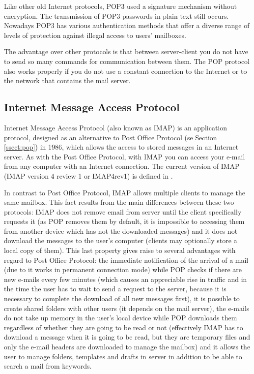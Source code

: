 Like other old Internet protocols, POP3 used a signature mechanism without encryption. The transmission of POP3 passwords in plain text still occurs. Nowadays POP3 has various authentication methods that offer a diverse range of levels of protection against illegal access to users' mailboxes.

The advantage over other protocols is that between server-client you do not have to send so many commands for communication between them. The POP protocol also works properly if you do not use a constant connection to the Internet or to the network that contains the mail server.

\subsection{Internet Message Access Protocol} \label{ssect:imap}

Internet Message Access Protocol (also known as IMAP) is an application protocol, designed as an alternative to Post Office Protocol (se Section \ref{ssect:pop}) in 1986, which allows the access to stored messages in an Internet server. As with the Post Office Protocol, with IMAP you can access your e-mail from any computer with an Internet connection. The current version of IMAP (IMAP version 4 review 1 or IMAP4rev1) is defined in \cite{rfc3501}.

In contrast to Post Office Protocol, IMAP allows multiple clients to manage the same mailbox. This fact results from the main differences between these two protocols: IMAP does not remove email from server until the client specifically requests it (as POP removes them by default, it is impossible to accessing them from another device which has not the downloaded messages) and it does not download the messages to the user's computer (clients may optionally store a local copy of them). This last property gives raise to several advantages with regard to Post Office Protocol: the immediate notification of the arrival of a mail (due to it works in permanent connection mode) while POP checks if there are new e-mails every few minutes (which causes an appreciable rise in traffic and in the time the user has to wait to send a request to the server, because it is necessary to complete the download of all new messages first), it is possible to create shared folders with other users (it depends on the mail server), the e-mails do not take up memory in the user's local device while POP downloads them regardless of whether they are going to be read or not (effectively IMAP has to download a message when it is going to be read, but they are temporary files and only the e-mail headers are downloaded to manage the mailbox) and it allows the user to manage folders, templates and drafts in server in addition to be able to search a mail from keywords.

